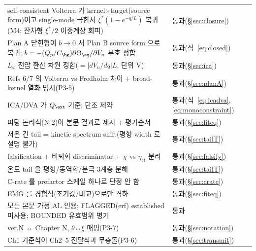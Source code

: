 \begin{longtable}{p{} p{}}
self-consistent Volterra 가 kernel$\times$target(source form)이고 single-mode 극한서 $\xi^\ast(1-e^{-q/L})$ 복귀(M4; 잔차형 $\xi^\ast/2$ 이중계상 회피) & 통과(\S\ref{sec:closure}) \\
Plan A 닫힌형이 $b\to0$ 서 Plan B source form 으로 복귀; $b=-(Q_p/C_\bg)\partial\Theta_\eq/\partial V_n$ 부호 정합 & 통과(식~\eqref{eq:closed}) \\
$L_\varphi$ 전압 환산 차원 정합($=|dV_n/dq|L$, 단위 V) & 통과(\S\ref{sec:ica}) \\
Refs 6/7 의 Volterra vs Fredholm 차이 + broad-kernel 열화 명시(P3-5) & 통과(\S\ref{sec:planA}) \\
ICA/DVA 가 $Q_\ext$ 기준; 단조 제약 & 통과(식~\eqref{eq:icadva},\eqref{eq:monoconstraint}) \\
피팅 논리식(N-2)이 본문 결과로 제시 + 평가순서 & 통과(\S\ref{sec:fiteq}) \\
저온 긴 tail = kinetic spectrum shift(평형 width 로 설명 불가) & 통과(\S\ref{sec:tailT}) \\
falsification + 비퇴화 discriminator + $\chi$ vs $\eta_\mathrm{ct}$ 분리 & 통과(\S\ref{sec:falsify}) \\
온도 tail 을 평형/동역학/분극 3계층 분해 & 통과(\S\ref{sec:tailT}) \\
C-rate 를 prefactor 스케일 하나로 단정 안 함 & 통과(\S\ref{sec:crate}) \\
EMG 를 경험식(초기값/비교)으로만 격하 & 통과(\S\ref{sec:fiteq}) \\
모든 본문 가정 AL 인용; FLAGGED(erf) established 미사용; BOUNDED 유효범위 병기 & 통과 \\
ver.N ↔ Chapter N, $\theta$↔$\xi$ 매핑(P3-7) & 통과(\S\ref{sec:notation}) \\
Ch1 기준식이 Ch2--5 전달식과 무충돌(P3-6) & 통과(\S\ref{sec:transmit}) \\
\bottomrule
\end{longtable}



